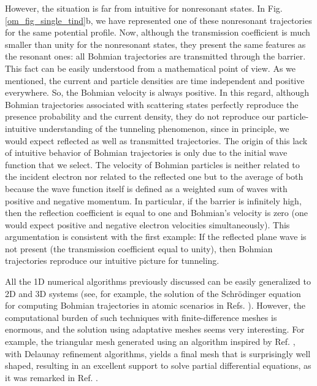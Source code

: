 \documentclass[onecolumn,nofootinbib, secnumarabic, amsmath, nobibnotes,12pt,aps,pra]{revtex4-1}
\newcommand{\fref}[1]{Fig. \ref{#1}}
\begin{document}
However, the situation is far from intuitive for nonresonant states. In \fref{om_fig_single_tind}b, we have represented one of these nonresonant trajectories for the same potential profile. Now, although the transmission coefficient is much smaller than unity for the nonresonant states, they present the same features as the resonant ones: all Bohmian trajectories are transmitted through the barrier. This fact can be easily understood from a mathematical point of view. As we mentioned, the current and particle densities are time independent and positive everywhere. So, the Bohmian velocity is always positive. In this regard, although Bohmian trajectories associated with scattering states perfectly reproduce the presence probability and the current density, they do not reproduce our particle-intuitive understanding of the tunneling phenomenon, since in principle, we would expect reflected as well as transmitted trajectories. The origin of this lack of intuitive behavior of Bohmian trajectories is only due to the initial wave function that we select. The velocity of Bohmian particles is neither related to the incident electron nor related to the reflected one but to the average of both because the wave function itself is defined as a weighted sum of waves with positive and negative momentum. In particular, if the barrier is infinitely high, then the reflection coefficient is equal to one and Bohmian's velocity is zero (one would expect positive and negative electron velocities simultaneously). This argumentation is consistent with the first example: If the reflected plane wave is not present (the transmission coefficient equal to unity), then Bohmian trajectories reproduce our intuitive picture for tunneling.

All the 1D numerical algorithms previously discussed can be easily
generalized to 2D and 3D systems (see, for example, the solution of
the Schr\"odinger equation for computing Bohmian trajectories in
atomic scenarios in Refs. \cite{om.mompart1,om.mompart2}). However,
the computational burden of such techniques with finite-difference
meshes is enormous, and the solution using adaptative meshes seems
very interesting. For example, the triangular mesh generated using
an algorithm inspired by Ref. \cite{om.Persson}, with Delaunay refinement
algorithms, yields a final mesh that is surprisingly well shaped,
resulting in an excellent support to solve partial differential
equations, as it was remarked in Ref. \cite{om.Pinto}.\vspace*{-9pt}
\end{document}
